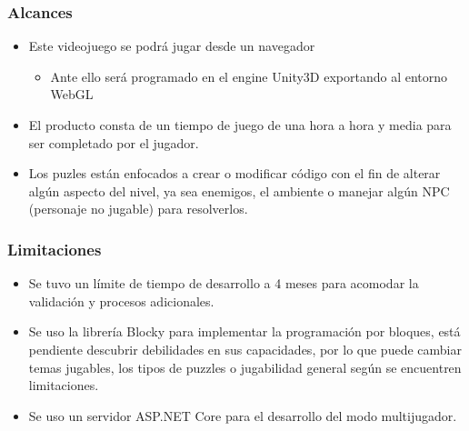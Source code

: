 \subsubsection{Alcances}
\begin{itemize}
    \item Este videojuego se podrá jugar desde un navegador
    \begin{itemize}
        \item Ante ello será programado en el engine Unity3D exportando al entorno WebGL
    \end{itemize}
    \item El producto consta de un tiempo de juego de una hora a hora y media para ser completado por el jugador.
    \item Los puzles están enfocados a crear o modificar código con el fin de alterar algún aspecto del nivel, ya sea enemigos, el ambiente o manejar algún NPC (personaje no jugable) para resolverlos.
\end{itemize}

\subsubsection{Limitaciones}
\begin{itemize}
    \item Se tuvo un límite de tiempo de desarrollo a 4 meses para acomodar la validación y procesos adicionales. 
    \item Se uso la librería Blocky para implementar la programación por bloques, está pendiente descubrir debilidades en sus capacidades, por lo que puede cambiar temas jugables, los tipos de puzzles o jugabilidad general según se encuentren limitaciones.
    \item Se uso un servidor ASP.NET Core para el desarrollo del modo multijugador.
\end{itemize}
